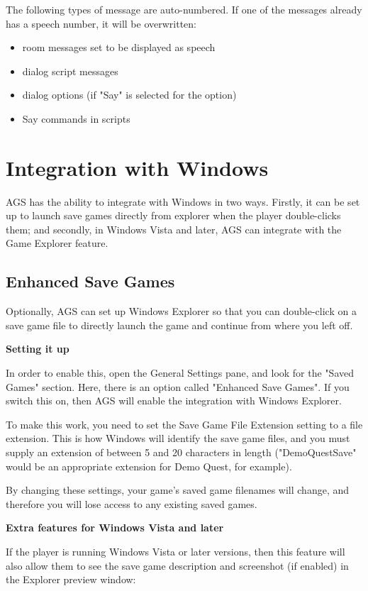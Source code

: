 The following types of message are auto-numbered. If one of the messages already has a speech
number, it will be overwritten:
\begin{itemize}
\item room messages set to be displayed as speech
\item dialog script messages
\item dialog options (if "Say" is selected for the option)
\item Say commands in scripts
\end{itemize}


\section{Integration with Windows}%

AGS has the ability to integrate with Windows in two ways. Firstly, it can
be set up to launch save games directly from explorer when the player double-clicks
them; and secondly, in Windows Vista and later, AGS can integrate with the Game Explorer feature.


\subsection{Enhanced Save Games}\label{EnhancedSaveGames}%

Optionally, AGS can set up Windows Explorer so that you can double-click on a save game
file to directly launch the game and continue from where you left off.

\bf{Setting it up}

In order to enable this, open the General Settings pane, and look for the "Saved Games"
section. Here, there is an option called "Enhanced Save Games". If you switch this on,
then AGS will enable the integration with Windows Explorer.

To make this work, you need to set the Save Game File Extension setting to a file extension.
This is how Windows will identify the save game files, and you must supply an extension
of between 5 and 20 characters in length ("DemoQuestSave" would be an appropriate
extension for Demo Quest, for example).

By changing these settings, your game's saved game filenames will change, and therefore
you will lose access to any existing saved games.

\bf{Extra features for Windows Vista and later}

If the player is running Windows Vista or later versions, then this feature will also allow them to see
the save game description and screenshot (if enabled) in the Explorer preview window:

